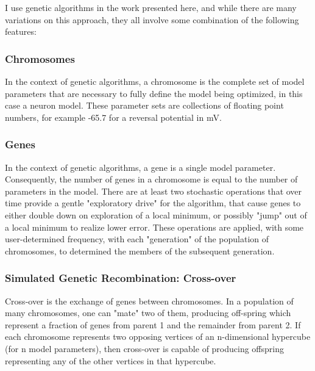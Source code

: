 I use genetic algorithms in the work presented here, and while there are many variations on this approach, they all involve some combination of the following features:
\subsubsection{Chromosomes}
In the context of genetic algorithms, a chromosome is the complete set of model parameters that are necessary to fully define the model being optimized, in this case a neuron model.
These parameter sets are collections of floating point numbers, for example -65.7 for a reversal potential in mV.
\subsubsection{Genes}
In the context of genetic algorithms, a gene is a single model parameter.  Consequently, the number of genes in a chromosome is equal to the number of parameters in the model.
There are at least two stochastic operations that over time provide a gentle "exploratory drive" for the algorithm, that cause genes to either double down on exploration of a local minimum, or possibly "jump" out of a local minimum to realize lower error.  These operations are applied, with some user-determined frequency, with each "generation" of the population of chromosomes, to determined the members of the subsequent generation.
\subsubsection{Simulated Genetic Recombination: Cross-over}
Cross-over is the exchange of genes between chromosomes.  In a population of many chromosomes, one can "mate" two of them, producing off-spring which represent a fraction of genes from parent 1 and the remainder from parent 2.  If each chromosome represents two opposing vertices of an n-dimensional hypercube (for n model parameters), then cross-over is capable of producing offspring representing any of the other vertices in that hypercube.
